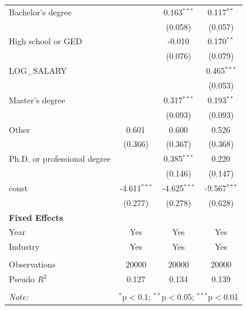 \begin{table}[!htbp]
\begin{tabular}{@{\extracolsep{5pt}}lccc}
 Bachelor's degree & & 0.163$^{***}$ & 0.117$^{**}$ \\
& & (0.058) & (0.057) \\
 High school or GED & & -0.010$^{}$ & 0.170$^{**}$ \\
& & (0.076) & (0.079) \\
 LOG_SALARY & & & 0.465$^{***}$ \\
& & & (0.053) \\
 Master's degree & & 0.317$^{***}$ & 0.193$^{**}$ \\
& & (0.093) & (0.093) \\
 Other & 0.601$^{}$ & 0.600$^{}$ & 0.526$^{}$ \\
& (0.366) & (0.367) & (0.368) \\
 Ph.D. or professional degree & & 0.385$^{***}$ & 0.220$^{}$ \\
& & (0.146) & (0.147) \\
 const & -4.611$^{***}$ & -4.625$^{***}$ & -9.567$^{***}$ \\
& (0.277) & (0.278) & (0.628) \\
 \textbf{Fixed Effects} &  &  &  \\
 Year & Yes & Yes & Yes \\
 Industry & Yes & Yes & Yes \\
\hline \\[-1.8ex]
 Observations & 20000 & 20000 & 20000 \\
 Pseudo $R^2$ & 0.127 & 0.134 & 0.139 \\
\hline
\hline \\[-1.8ex]
\textit{Note:} & \multicolumn{3}{r}{$^{*}$p$<$0.1; $^{**}$p$<$0.05; $^{***}$p$<$0.01} \\
\end{tabular}
\end{table}